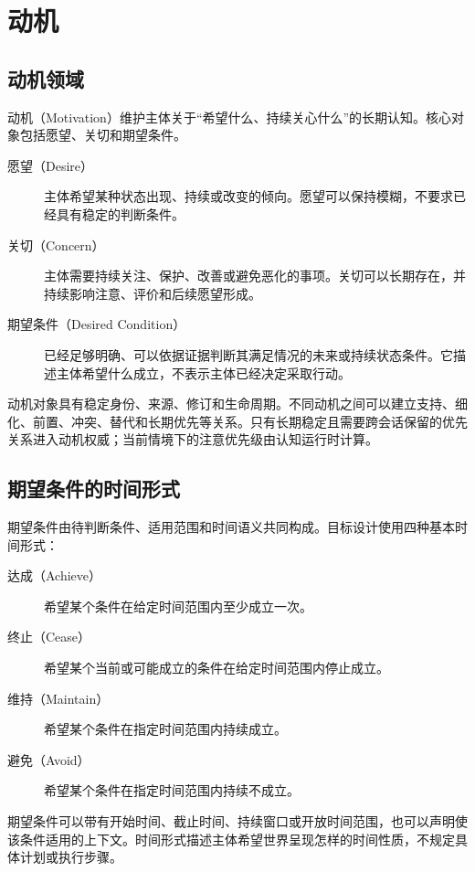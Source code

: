 \chapter{动机}

\section{动机领域}

动机（Motivation）维护主体关于“希望什么、持续关心什么”的长期认知。核心对象包括愿望、关切和期望条件。

\begin{description}
\item[愿望（Desire）] 主体希望某种状态出现、持续或改变的倾向。愿望可以保持模糊，不要求已经具有稳定的判断条件。
\item[关切（Concern）] 主体需要持续关注、保护、改善或避免恶化的事项。关切可以长期存在，并持续影响注意、评价和后续愿望形成。
\item[期望条件（Desired Condition）] 已经足够明确、可以依据证据判断其满足情况的未来或持续状态条件。它描述主体希望什么成立，不表示主体已经决定采取行动。
\end{description}

动机对象具有稳定身份、来源、修订和生命周期。不同动机之间可以建立支持、细化、前置、冲突、替代和长期优先等关系。只有长期稳定且需要跨会话保留的优先关系进入动机权威；当前情境下的注意优先级由认知运行时计算。

\section{期望条件的时间形式}

期望条件由待判断条件、适用范围和时间语义共同构成。目标设计使用四种基本时间形式：

\begin{description}
\item[达成（Achieve）] 希望某个条件在给定时间范围内至少成立一次。
\item[终止（Cease）] 希望某个当前或可能成立的条件在给定时间范围内停止成立。
\item[维持（Maintain）] 希望某个条件在指定时间范围内持续成立。
\item[避免（Avoid）] 希望某个条件在指定时间范围内持续不成立。
\end{description}

期望条件可以带有开始时间、截止时间、持续窗口或开放时间范围，也可以声明使该条件适用的上下文。时间形式描述主体希望世界呈现怎样的时间性质，不规定具体计划或执行步骤。

